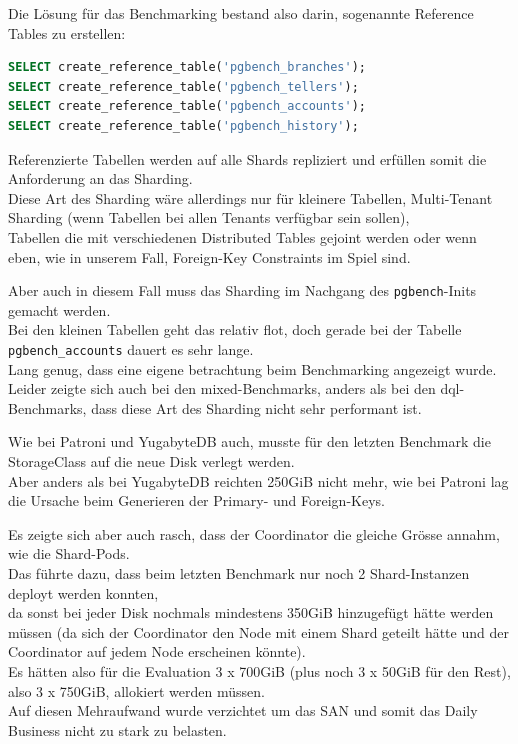 \begin{flushleft}
    Die Lösung für das Benchmarking bestand also darin, sogenannte Reference Tables zu erstellen:
\lstset{style=gra_codestyle}
\begin{lstlisting}[language=sql, caption=Citus - Benchmarking - Reference Table Sharding,captionpos=b,label={lst:benchmarking_reference_table_sharding},breaklines=true]
SELECT create_reference_table('pgbench_branches');
SELECT create_reference_table('pgbench_tellers');
SELECT create_reference_table('pgbench_accounts');
SELECT create_reference_table('pgbench_history');
\end{lstlisting}
    Referenzierte Tabellen werden auf alle Shards repliziert und erfüllen somit die Anforderung an das Sharding.\\
    Diese Art des Sharding wäre allerdings nur für kleinere Tabellen, Multi-Tenant Sharding (wenn Tabellen bei allen Tenants verfügbar sein sollen),\\
    Tabellen die mit verschiedenen Distributed Tables gejoint werden oder wenn eben, wie in unserem Fall, Foreign-Key Constraints im Spiel sind\cite{KPPLMKD4}.
\end{flushleft}
\begin{flushleft}
    Aber auch in diesem Fall muss das Sharding im Nachgang des \texttt{pgbench}-Inits gemacht werden.\\
    Bei den kleinen Tabellen geht das relativ flot, doch gerade bei der Tabelle \texttt{pgbench\_accounts} dauert es sehr lange.\\
    Lang genug, dass eine eigene betrachtung beim Benchmarking angezeigt wurde.\\
    Leider zeigte sich auch bei den mixed-Benchmarks, anders als bei den dql-Benchmarks, dass diese Art des Sharding nicht sehr performant ist.
\end{flushleft}
\begin{flushleft}
    Wie bei Patroni und YugabyteDB auch, musste für den letzten Benchmark die StorageClass auf die neue Disk verlegt werden.\\
    Aber anders als bei YugabyteDB reichten 250GiB nicht mehr, wie bei Patroni lag die Ursache beim Generieren der Primary- und Foreign-Keys.
\end{flushleft}
\begin{flushleft}
    Es zeigte sich aber auch rasch, dass der Coordinator die gleiche Grösse annahm, wie die Shard-Pods.\\
    Das führte dazu, dass beim letzten Benchmark nur noch 2 Shard-Instanzen deployt werden konnten,\\
    da sonst bei jeder Disk nochmals mindestens 350GiB hinzugefügt hätte werden müssen (da sich der Coordinator den Node mit einem Shard geteilt hätte und der Coordinator auf jedem Node erscheinen könnte).\\
    Es hätten also für die Evaluation 3 x 700GiB (plus noch 3 x 50GiB für den Rest), also 3 x 750GiB, allokiert werden müssen.\\
    Auf diesen Mehraufwand wurde verzichtet um das \Gls{SAN} und somit das Daily Business nicht zu stark zu belasten.
\end{flushleft}
